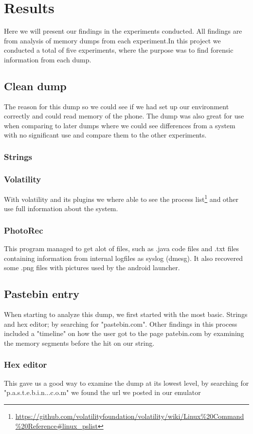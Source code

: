 \section{Results}
Here we will present our findings in the experiments conducted. All findings are from analysis of memory dumps from each experiment.In this project we conducted a total of five experiments, where the purpose was to find forensic information from each dump.
\subsection{Clean dump}
The reason for this dump so we could see if we had set up our environment correctly and could read memory of the phone. The dump was also great for use when comparing to later dumps where we could see differences from a system with no significant use and compare them to the other experiments.
\subsubsection{Strings}
\subsubsection{Volatility}
With volatility and its plugins we where able to see the process list\footnote{\url{https://github.com/volatilityfoundation/volatility/wiki/Linux\%20Command\%20Reference\#linux_pslist}} and other use full information about the system.
\subsubsection{PhotoRec}
This program managed to get alot of files, such as .java code files and .txt files containing information from internal logfiles as syslog (dmesg). It also recovered some .png files with pictures used by the android launcher.
\subsection{Pastebin entry}
When starting to analyze this dump, we first started with the most basic. Strings and hex editor; by searching for "pastebin.com". Other findings in this process included a "timeline" on how the user got to the page patebin.com by examining the memory segments before the hit on our string.
\subsubsection{Hex editor}
This gave us a good way to examine the dump at its lowest level, by searching for "p.a.s.t.e.b.i.n...c.o.m" we found the url we posted in our emulator
